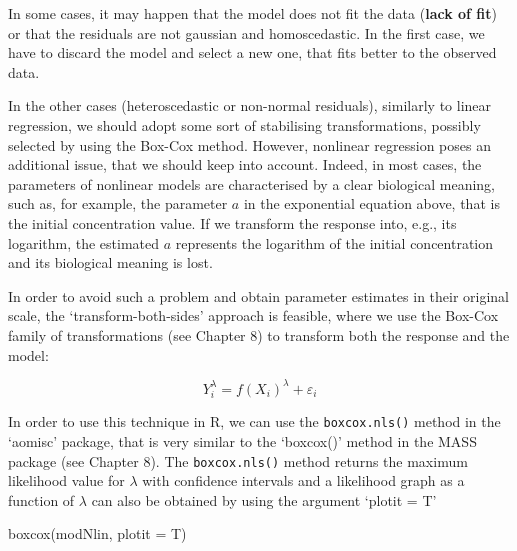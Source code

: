 \documentclass[a4paper,12pt,oneside]{book}
\newenvironment{Shaded}{\begin{snugshade}}{\end{snugshade}}
\newcommand{\SpecialCharTok}[1]{#1}
\newcommand{\DocumentationTok}[1]{#1}
\newcommand{\OtherTok}[1]{#1}
\newcommand{\FunctionTok}[1]{#1}
\newcommand{\AttributeTok}[1]{#1}
\newcommand{\NormalTok}[1]{#1}
\begin{document}
In some cases, it may happen that the model does not fit the data (\textbf{lack of fit}) or that the residuals are not gaussian and homoscedastic. In the first case, we have to discard the model and select a new one, that fits better to the observed data.

In the other cases (heteroscedastic or non-normal residuals), similarly to linear regression, we should adopt some sort of stabilising transformations, possibly selected by using the Box-Cox method. However, nonlinear regression poses an additional issue, that we should keep into account. Indeed, in most cases, the parameters of nonlinear models are characterised by a clear biological meaning, such as, for example, the parameter \(a\) in the exponential equation above, that is the initial concentration value. If we transform the response into, e.g., its logarithm, the estimated \(a\) represents the logarithm of the initial concentration and its biological meaning is lost.

In order to avoid such a problem and obtain parameter estimates in their original scale, the `transform-both-sides' approach is feasible, where we use the Box-Cox family of transformations (see Chapter 8) to transform both the response and the model:

\[Y_i^\lambda  = f(X_i)^\lambda + \varepsilon_i\]

In order to use this technique in R, we can use the \texttt{boxcox.nls()} method in the `aomisc' package, that is very similar to the `boxcox()' method in the MASS package (see Chapter 8). The \texttt{boxcox.nls()} method returns the maximum likelihood value for \(\lambda\) with confidence intervals and a likelihood graph as a function of \(\lambda\) can also be obtained by using the argument `plotit = T'

\vspace{12pt}

\begin{Shaded}
\end{Shaded}

\begin{Shaded}
\begin{Highlighting}[]
\FunctionTok{boxcox}\NormalTok{(modNlin, }\AttributeTok{plotit =}\NormalTok{ T)}
\end{Highlighting}
\end{Shaded}
\end{document}
